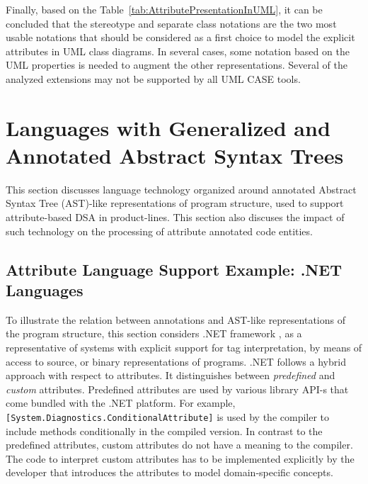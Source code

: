 Finally, based on the Table~\ref{tab:AttributePresentationInUML}, it can be concluded
that the stereotype and separate class notations are the two most usable notations that should be considered as a first choice to model the explicit attributes in UML class diagrams. In several cases, some notation based on the UML properties is needed to augment the other representations. Several of the analyzed extensions may not be supported by all UML CASE tools.

\section{Languages with Generalized and Annotated Abstract Syntax Trees}
\label{sec:gaast}

This section discusses language technology organized around annotated Abstract Syntax Tree (AST)-like representations of program structure, used to support attribute-based DSA in product-lines. This section also discuses the impact of such technology on the processing of attribute annotated code entities.


\subsection{Attribute Language Support Example: .NET Languages}
\label{c3.sec.dnet}

To illustrate the relation between annotations and AST-like representations of the program structure, this section considers .NET framework \cite{www.dotnet}, as a representative of systems with explicit support for tag interpretation, by means of access to source, or binary representations of programs.
%
.NET follows a hybrid approach with respect to attributes. It distinguishes between \emph{predefined} and \emph{custom} attributes. Predefined attributes are used by various library API-s that come bundled with the .NET platform. For example, \texttt{[Sy\-stem.Dia\-gno\-stics.Con\-ditional\-Attribute]} is used by the compiler to include methods conditionally in the compiled version. In contrast to the predefined attributes, custom attributes do not have a meaning to the compiler. The code to interpret custom attributes has to be implemented explicitly by the developer that introduces the attributes to model domain-specific concepts.

